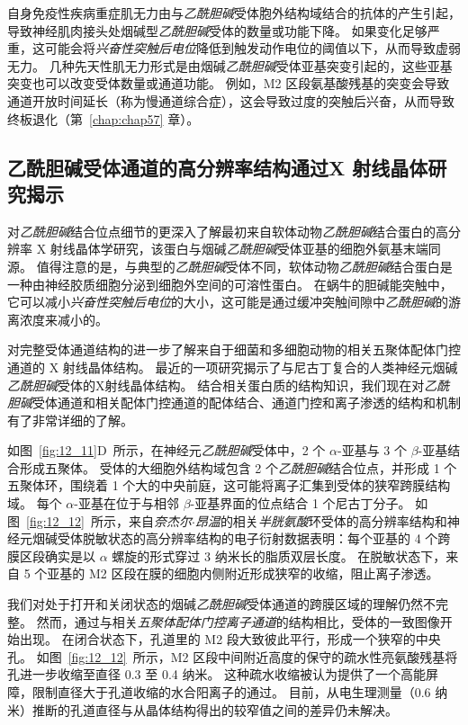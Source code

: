 自身免疫性疾病重症肌无力由与\textit{乙酰胆碱}受体胞外结构域结合的抗体的产生引起，导致神经肌肉接头处烟碱型\textit{乙酰胆碱}受体的数量或功能下降。
如果变化足够严重，这可能会将\textit{兴奋性突触后电位}降低到触发动作电位的阈值以下，从而导致虚弱无力。
几种先天性肌无力形式是由烟碱\textit{乙酰胆碱}受体亚基突变引起的，这些亚基突变也可以改变受体数量或通道功能。
例如，M2 区段氨基酸残基的突变会导致通道开放时间延长（称为慢通道综合症），这会导致过度的突触后兴奋，从而导致终板退化（第~\ref{chap:chap57} 章）。



\subsection{乙酰胆碱受体通道的高分辨率结构通过X 射线晶体研究揭示}

对\textit{乙酰胆碱}结合位点细节的更深入了解最初来自软体动物\textit{乙酰胆碱}结合蛋白的高分辨率 X 射线晶体学研究，该蛋白与烟碱\textit{乙酰胆碱}受体亚基的细胞外氨基末端同源。
值得注意的是，与典型的\textit{乙酰胆碱}受体不同，软体动物\textit{乙酰胆碱}结合蛋白是一种由神经胶质细胞分泌到细胞外空间的可溶性蛋白。
在蜗牛的胆碱能突触中，它可以减小\textit{兴奋性突触后电位}的大小，这可能是通过缓冲突触间隙中\textit{乙酰胆碱}的游离浓度来减小的。


对完整受体通道结构的进一步了解来自于细菌和多细胞动物的相关五聚体配体门控通道的 X 射线晶体结构。
最近的一项研究揭示了与尼古丁复合的人类神经元烟碱\textit{乙酰胆碱}受体的X射线晶体结构。
结合相关蛋白质的结构知识，我们现在对\textit{乙酰胆碱}受体通道和相关配体门控通道的配体结合、通道门控和离子渗透的结构和机制有了非常详细的了解。


如图~\ref{fig:12_11}D~所示，在神经元\textit{乙酰胆碱}受体中，2 个 $\alpha$-亚基与 3 个 $\beta$-亚基结合形成五聚体。
受体的大细胞外结构域包含 2 个\textit{乙酰胆碱}结合位点，并形成 1 个五聚体环，围绕着 1 个大的中央前庭，这可能将离子汇集到受体的狭窄跨膜结构域。
每个 $\alpha$-亚基在位于与相邻 $\beta$-亚基界面的位点结合 1 个尼古丁分子。
如图~\ref{fig:12_12}~所示，来自\textit{奈杰尔$\cdot$昂温}的相关\textit{半胱氨酸}环受体的高分辨率结构和神经元烟碱受体脱敏状态的高分辨率结构的电子衍射数据表明：每个亚基的 4 个跨膜区段确实是以 $\alpha$ 螺旋的形式穿过 3 纳米长的脂质双层长度。
在脱敏状态下，来自 5 个亚基的 M2 区段在膜的细胞内侧附近形成狭窄的收缩，阻止离子渗透。


我们对处于打开和关闭状态的烟碱\textit{乙酰胆碱}受体通道的跨膜区域的理解仍然不完整。
然而，通过与相关\textit{五聚体配体门控离子通道}的结构相比，受体的一致图像开始出现。
在闭合状态下，孔道里的 M2 段大致彼此平行，形成一个狭窄的中央孔。
如图~\ref{fig:12_12}~所示，M2 区段中间附近高度的保守的疏水性亮氨酸残基将孔进一步收缩至直径 0.3 至 0.4 纳米。
这种疏水收缩被认为提供了一个高能屏障，限制直径大于孔道收缩的水合阳离子的通过。
目前，从电生理测量（0.6 纳米）推断的孔道直径与从晶体结构得出的较窄值之间的差异仍未解决。


